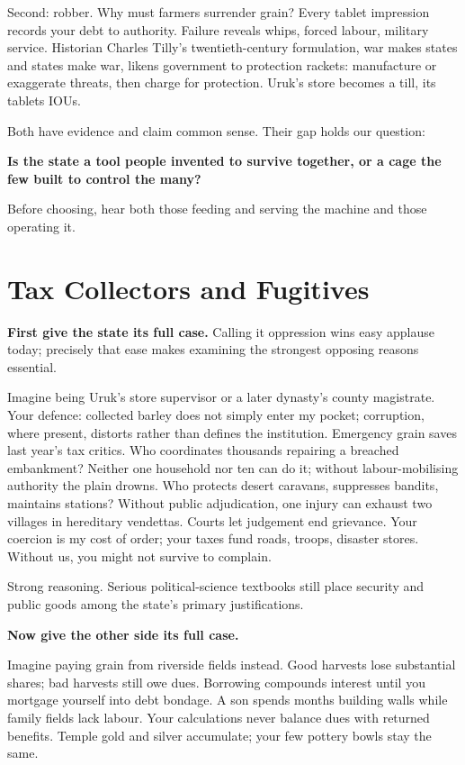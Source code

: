 Second: robber. Why must farmers surrender grain? Every tablet impression records your debt to authority. Failure reveals whips, forced labour, military service. Historian Charles Tilly's twentieth-century formulation, war makes states and states make war, likens government to protection rackets: manufacture or exaggerate threats, then charge for protection. Uruk's store becomes a till, its tablets IOUs.

Both have evidence and claim common sense. Their gap holds our question:

\textbf{Is the state a tool people invented to survive together, or a cage the few built to control the many?}

Before choosing, hear both those feeding and serving the machine and those operating it.

\section{Tax Collectors and Fugitives}
\textbf{First give the state its full case.} Calling it oppression wins easy applause today; precisely that ease makes examining the strongest opposing reasons essential.

Imagine being Uruk's store supervisor or a later dynasty's county magistrate. Your defence: collected barley does not simply enter my pocket; corruption, where present, distorts rather than defines the institution. Emergency grain saves last year's tax critics. Who coordinates thousands repairing a breached embankment? Neither one household nor ten can do it; without labour-mobilising authority the plain drowns. Who protects desert caravans, suppresses bandits, maintains stations? Without public adjudication, one injury can exhaust two villages in hereditary vendettas. Courts let judgement end grievance. Your coercion is my cost of order; your taxes fund roads, troops, disaster stores. Without us, you might not survive to complain.

Strong reasoning. Serious political-science textbooks still place security and public goods among the state's primary justifications.

\textbf{Now give the other side its full case.}

Imagine paying grain from riverside fields instead. Good harvests lose substantial shares; bad harvests still owe dues. Borrowing compounds interest until you mortgage yourself into debt bondage. A son spends months building walls while family fields lack labour. Your calculations never balance dues with returned benefits. Temple gold and silver accumulate; your few pottery bowls stay the same.

